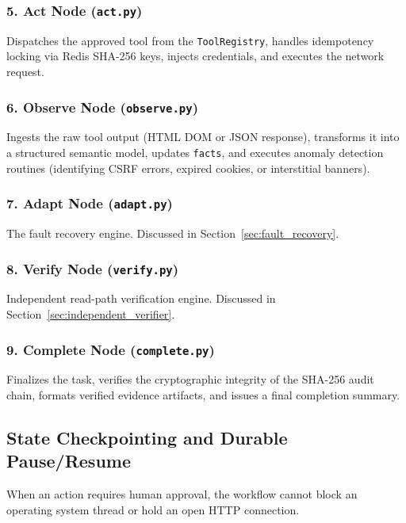 \subsubsection{5. Act Node (\texttt{act.py})}
Dispatches the approved tool from the \texttt{ToolRegistry}, handles idempotency locking via Redis SHA-256 keys, injects credentials, and executes the network request.

\subsubsection{6. Observe Node (\texttt{observe.py})}
Ingests the raw tool output (HTML DOM or JSON response), transforms it into a structured semantic model, updates \texttt{facts}, and executes anomaly detection routines (identifying CSRF errors, expired cookies, or interstitial banners).

\subsubsection{7. Adapt Node (\texttt{adapt.py})}
The fault recovery engine. Discussed in Section~\ref{sec:fault_recovery}.

\subsubsection{8. Verify Node (\texttt{verify.py})}
Independent read-path verification engine. Discussed in Section~\ref{sec:independent_verifier}.

\subsubsection{9. Complete Node (\texttt{complete.py})}
Finalizes the task, verifies the cryptographic integrity of the SHA-256 audit chain, formats verified evidence artifacts, and issues a final completion summary.

\subsection{State Checkpointing and Durable Pause/Resume}
When an action requires human approval, the workflow cannot block an operating system thread or hold an open HTTP connection. 

